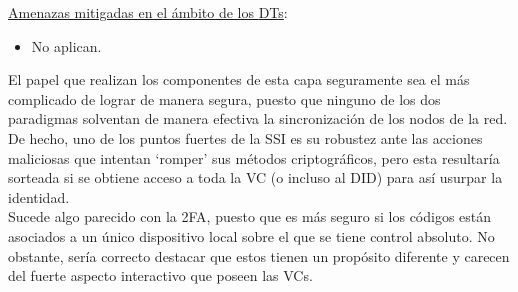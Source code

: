 \documentclass[../main.tex]{subfiles}
\begin{document}
\begin{enumerate}[label=\textbf{R2.\arabic*}, leftmargin=48pt]
    \underline{Amenazas mitigadas en el ámbito de los \acrshort{DT}s}: 
    \begin{itemize}
        \item No aplican.
        \\
    \end{itemize} 
\end{enumerate}

\begin{tcolorbox}[colback=gray!10!white, colframe=gray!50!black, title=Análisis de la Capa \theanalisis]\label{analisis-C2}
El papel que realizan los componentes de esta capa seguramente sea el más complicado de lograr de manera segura, puesto que ninguno de los dos paradigmas solventan de manera efectiva la sincronización de los nodos de la red. 
\\

De hecho, uno de los puntos fuertes de la \acrshort{SSI} es su robustez ante las acciones maliciosas que intentan `romper' sus métodos criptográficos, pero esta resultaría sorteada si se obtiene acceso a toda la \acrshort{VC} (o incluso al \acrshort{DID}) para así usurpar la identidad.  
\\

Sucede algo parecido con la \Gls{2FA}, puesto que es más seguro si los códigos están asociados a un único dispositivo local sobre el que se tiene control absoluto. No obstante, sería correcto destacar que estos tienen un propósito diferente y carecen del fuerte aspecto interactivo que poseen las \acrshort{VC}s.
\end{tcolorbox}


\newpage
\end{document}
